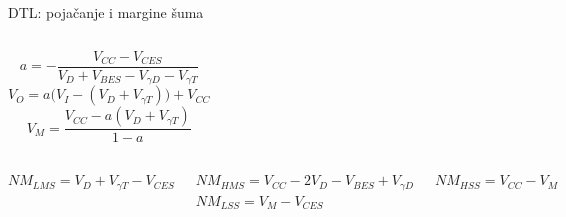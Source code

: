 \begin{frame}[label=10-s047]{DTL: pojačanje i margine šuma}
\setlength{\abovedisplayskip}{4pt}\setlength{\belowdisplayskip}{4pt}\setlength{\abovedisplayshortskip}{3pt}\setlength{\belowdisplayshortskip}{3pt}
\begin{columns}[T,onlytextwidth]\centering \raggedright
\[a=-\frac{V_{CC}-V_{CES}}{V_D+V_{BES}-V_{\gamma D}-V_{\gamma T}}\]
\[V_O=a\bigl(V_I-(V_D+V_{\gamma T})\bigr)+V_{CC}\]
\[V_M=\frac{V_{CC}-a(V_D+V_{\gamma T})}{1-a}\]\end{columns}\medskip
\begin{columns}[T,onlytextwidth]\medskip
$NM_{LMS}=V_D+V_{\gamma T}-V_{CES}$\par
$NM_{HMS}=V_{CC}-2V_D-V_{BES}+V_{\gamma D}$
\medskip
$NM_{LSS}=V_M-V_{CES}$\par
$NM_{HSS}=V_{CC}-V_M$
\end{columns}
\end{frame}
